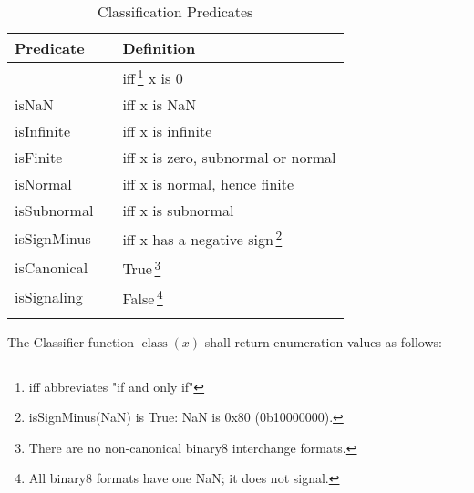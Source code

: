 \documentclass{article}
\begin{document}
\begin{table}[htb]
\begin{center}
\begin{minipage}[t]{0.55\textwidth}
~\\[-\baselineskip] %
\raggedright
\begin{tabular}{l c l}
\toprule
Predicate & & Definition\\
\midrule \addlinespace[1.2ex]
  {isZero}       &  &  {if\/f\,\footnote{iff abbreviates "if and only if"}  x  is 0} \\
  {isNaN}        &  &  {if\/f x  is NaN}\\
  {isInfinite}   &  &  {if\/f x is infinite}\\
  {isFinite}     &  &  {if\/f x is zero, subnormal or normal}\\
  {isNormal}     &  &  {if\/f x is normal, hence finite}\\
  {isSubnormal}  &  &  {if\/f x is subnormal}\\
  {isSignMinus}  &  &  {if\/f x has a negative sign\,\footnote{isSignMinus(NaN) is True: NaN is 0x80 (0b10000000).}}\\
  {isCanonical}  &  &  {True\,\footnote{There are no non-canonical binary8 interchange formats.}}\\
  {isSignaling}  &  &  {False\,\footnote{All binary8 formats have one NaN; it does not signal.}}\\ \addlinespace[0.2ex]
\bottomrule
\end{tabular}
\end{minipage}
\end{center}
\caption{Classification Predicates} \label{classification-predicates}
\end{table}

\bigskip
\raggedright
The Classifier function $\operatorname{class}(x)$ shall return enumeration values as follows:\\
\bigskip
\end{document}

